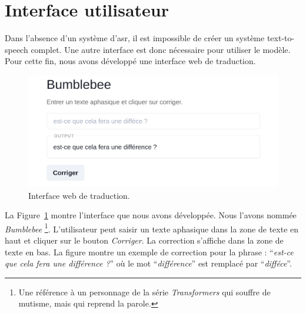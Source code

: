 \section{Interface utilisateur}%
\label{sec.results.interface}

Dans l'absence d'un système d'\gls{asr}, 
il est impossible de créer un système \foreignlanguage{english}{text-to-speech} complet.
Une autre interface est donc nécessaire pour utiliser le modèle.
Pour cette fin, nous avons développé une interface web de traduction.

\begin{figure}[hbt]
    \begin{center}
        \includegraphics[width=\linewidth]{assets/images/interface.png}
    \end{center}
    \caption{Interface web de traduction.}%
    \label{fig.interface}
\end{figure}

La Figure~\ref{fig.interface} montre l'interface que nous avons développée.
Nous l'avons nommée \textit{Bumblebee}%
\footnote{Une référence à un personnage de la série \textit{Transformers} qui souffre de mutisme, 
mais qui reprend la parole.}.
L'utilisateur peut saisir un texte aphasique dans la zone de texte en haut 
et cliquer sur le bouton \textit{Corriger}.
La correction s'affiche dans la zone de texte en bas.
La figure montre un exemple de correction pour la phrase : ``\textit{est-ce que cela fera une différence ?}''
où le mot ``\textit{différence}'' est remplacé par ``\textit{difféce}''.